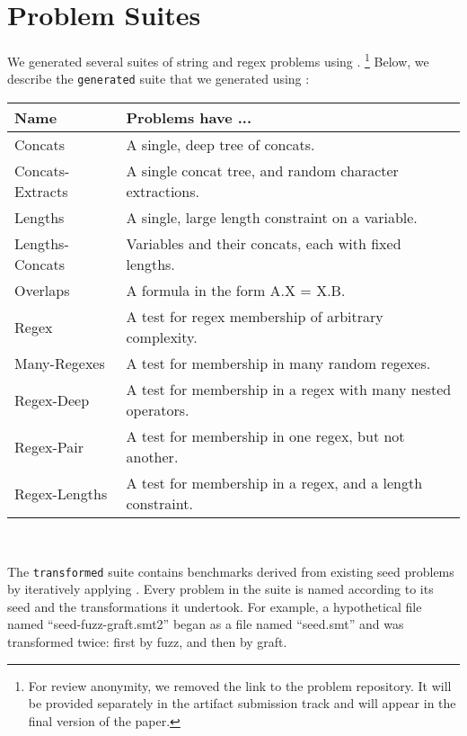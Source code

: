 \section{Problem Suites}
\label{sec:problems}

    We generated several suites of string and regex problems using \fuzzer{}. \footnote{For review anonymity, we removed the link to the problem repository. It will be provided separately in the artifact submission track and will appear in the final version of the paper.} Below, we describe the \texttt{generated} suite that we generated using \generator{}: \\

    \begin{tabular}{|l|l|}
        \hline
        \textbf{Name}    & \textbf{Problems have ...} \\ \hline
        Concats          & A single, deep tree of concats. \\ \hline
        Concats-Extracts & A single concat tree, and random character extractions. \\ \hline
        Lengths          & A single, large length constraint on a variable. \\ \hline
        Lengths-Concats  & Variables and their concats, each with fixed lengths. \\ \hline
        Overlaps         & A formula in the form A.X = X.B. \\ \hline
        Regex            & A test for regex membership of arbitrary complexity. \\ \hline
        Many-Regexes     & A test for membership in many random regexes. \\ \hline
        Regex-Deep       & A test for membership in a regex with many nested operators. \\ \hline
        Regex-Pair       & A test for membership in one regex, but not another. \\ \hline
        Regex-Lengths    & A test for membership in a regex, and a length constraint. \\ \hline
    \end{tabular}
    \hfill \\


    The \texttt{transformed} suite contains benchmarks derived from existing seed problems by iteratively applying \transformer{}.
    Every problem in the suite is named according to its seed and the transformations it undertook. 
    For example, a hypothetical file named ``seed-fuzz-graft.smt2'' began as a file named ``seed.smt'' and was transformed twice:
    first by fuzz, and then by graft. 
    

